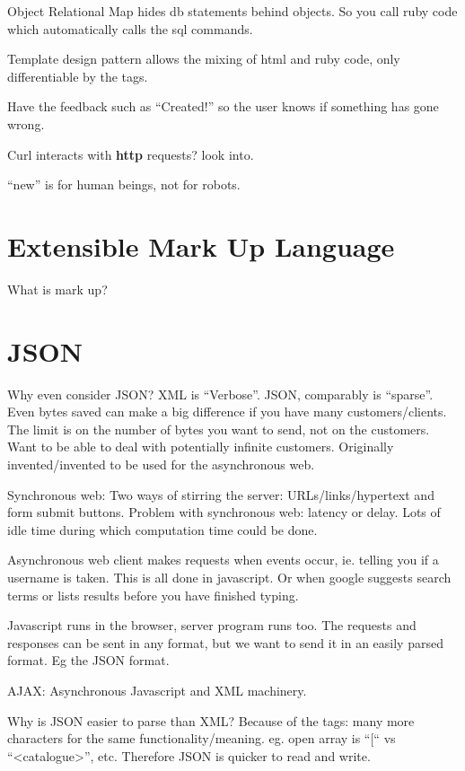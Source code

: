 \documentclass[11pt]{article}
\begin{document}
Object Relational Map hides db statements behind objects. So you call ruby code which automatically calls the sql commands.

Template design pattern allows the mixing of html and ruby code, only differentiable by the tags.

Have the feedback such as “Created!” so the user knows if something has gone wrong.

Curl interacts with \textbf{http} requests? look into.

“new” is for human beings, not for robots.


\section{Extensible Mark Up Language}
\label{sec:XML}

What is mark up?


\section{JSON}

Why even consider JSON? XML is “Verbose”. JSON, comparably is “sparse”. Even bytes saved can make a big difference if you have many customers/clients. The limit is on the number of bytes you want to send, not on the customers. Want to be able to deal with potentially infinite customers. Originally invented/invented to be used for the asynchronous web.

Synchronous web:
Two ways of stirring the server: URLs/links/hypertext and form submit buttons.
Problem with synchronous web: latency or delay. Lots of idle time during which computation time could be done.

Asynchronous web
client makes requests when events occur, ie. telling you if a username is taken. This is all done in javascript. Or when google suggests search terms or lists results before you have finished typing.

Javascript runs in the browser, server program runs too. The requests and responses can be sent in any format, but we want to send it in an easily parsed format. Eg the JSON format.

AJAX: Asynchronous Javascript and XML machinery.

Why is JSON easier to parse than XML? Because of the tags: many more characters for the same functionality/meaning. eg. open array is “[“ vs “<catalogue>”, etc. Therefore JSON is quicker to read and write.
\end{document}
